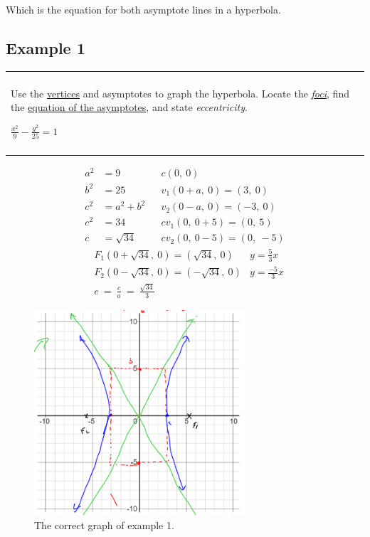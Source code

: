 \documentclass{article}
\newenvironment{question}
  {\begin{center}
  \begin{tabular}{|p{0.9\textwidth}|}
  \hline\\
  }
  {
  \\\\\hline
  \end{tabular}
  \end{center}
  }
\begin{document}
Which is the equation for both asymptote lines in a hyperbola.

\subsection{Example 1}

\begin{question}
  Use the \underline{vertices} and asymptotes to graph the hyperbola. Locate the \textit{\underline{foci}}, find the \underline{equation of the asymptotes}, and state \textit{eccentricity}.
    \begin{center}
      $\frac{x^2}{9} - \frac{y^2}{25} = 1$
    \end{center}
\end{question}
\begin{align*}
  a^2 &= 9           &         &c(0,\ 0)\\
  b^2 &= 25          &         &v_1(0 + a,\ 0) = (3,\ 0)\\
  c^2 &= a^2 + b^2   &         &v_2(0 - a,\ 0) = (-3,\ 0)\\
  c^2 &= 34          &         &cv_1(0,\ 0 + 5) = (0,\ 5)\\
  c &= \sqrt{34}     &         &cv_2(0,\ 0 - 5) = (0,\ -5)
\end{align*}
\begin{align*}
  &F_1(0 + \sqrt{34},\ 0) = (\sqrt{34},\ 0)           &           y = \frac{5}{3}x\\
  &F_2(0 - \sqrt{34},\ 0) = (-\sqrt{34},\ 0)          &           y = \frac{-5}{3}x\\
  &e\ =\ \frac{c}{a}\ =\ \frac{\sqrt{34}}{3}
\end{align*}
\begin{figure}[H]
  \includegraphics[width=0.7\textwidth,center]{hyperbola1.png}
  \caption{The correct graph of example 1.}
  \label{fig:hyperbola4}
\end{figure}
\end{document}
